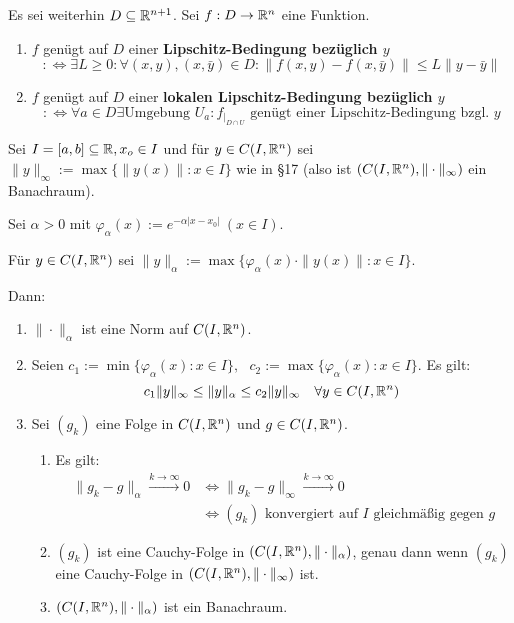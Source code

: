 \documentclass[a4paper,oneside,DIV15,BCOR12mm,chapterprefix=true,headings=onelinechapter]{scrbook}
\begin{document}
\begin{definition}
Es sei weiterhin $D \subseteq \mathbb{R}^{n+1}$. Sei $f: D \to \mathbb{R}^n$ eine Funktion.
\begin{enumerate}
\item $f$ genügt auf $D$ einer \textbf{Lipschitz-Bedingung bezüglich \boldmath \(y\)}
\[
    :\iff 
    \exists L \ge 0:
        \forall (x,y), (x,\bar y ) \in D: 
            \|f(x,y)-f(x,\bar y)\| \le L \|y-\bar y \|
\]
\item $f$ genügt auf $D$ einer \textbf{lokalen Lipschitz-Bedingung bezüglich \boldmath \(y\)}
\[
    :\iff
    \forall a \in D \exists \text{Umgebung } U_a:
    f_{|_{D \cap U}} \text{ genügt einer Lipschitz-Bedingung bzgl. } y
\]
\end{enumerate}
\end{definition}

\begin{satz}
Sei $I = [a,b] \subseteq \mathbb{R}, x_o \in I$ und für $y\in C(I, \mathbb{R}^n)$ sei $\|y\|_\infty := \max \{\|y(x)\| : x\in I \}$ wie in §17 (also ist $(C(I, \mathbb{R}^n), \|\cdot \|_\infty )$ ein Banachraum).

Sei $\alpha > 0$ mit $\varphi_\alpha (x) := e^{-\alpha |x-x_0|}\ (x \in I)$.

Für $y \in C(I, \mathbb{R}^n)$ sei $\|y\|_\alpha := \max \{\varphi_\alpha(x)\cdot \|y(x)\| : x\in I \}$.

Dann:
\begin{enumerate}
\item $\|\cdot\|_\alpha$ ist eine Norm auf $C(I,\mathbb{R}^n)$.
\item Seien $c_1 := \min \{ \varphi_\alpha(x) : x \in I \},\text{ } c_2 := \max \{ \varphi_\alpha(x) : x \in I \}$. Es gilt: 
\[c_1\|y\|_\infty \leq \|y\|_\alpha \leq c_2 \|y\|_\infty \quad \forall y \in C(I, \mathbb{R}^n)\]

\item Sei $(g_k)$ eine Folge in $C(I,\mathbb{R}^n)$ und $g \in C(I, \mathbb{R}^n)$.
\begin{enumerate}
\item Es gilt:
\begin{align*}
\|g_k -g\|_\alpha \stackrel{k \to \infty}\to 0 &\iff \|g_k - g\|_\infty \stackrel{k \to \infty}\to 0\\
&\iff (g_k)\text{ konvergiert auf $I$ gleichmäßig gegen $g$}
\end{align*}
\item $(g_k)$ ist eine Cauchy-Folge in $(C(I,\mathbb{R}^n), \|\cdot \|_\alpha)$, genau dann
wenn $(g_k)$ eine Cauchy-Folge in $(C(I,\mathbb{R}^n), \|\cdot \|_\infty)$ ist.
\item $(C(I,\mathbb{R}^n), \|\cdot \|_\alpha)$ ist ein Banachraum.
\end{enumerate}
\end{enumerate}
\end{satz}
\end{document}

